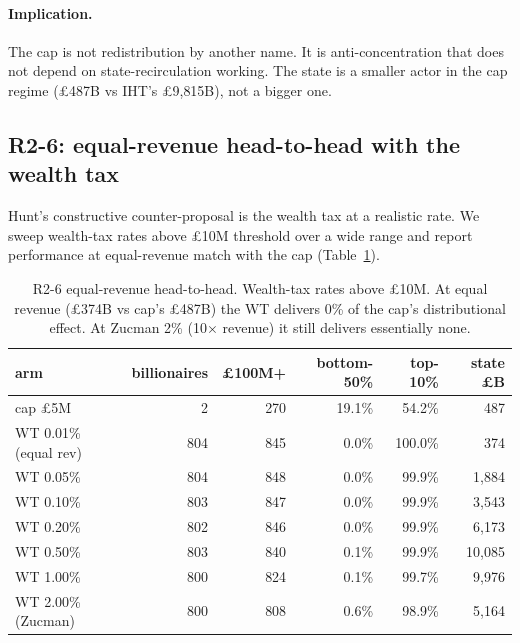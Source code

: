 \documentclass[11pt]{article}
\begin{document}
\paragraph{Implication.}  The cap is not redistribution by another
name.  It is anti-concentration that does not depend on
state-recirculation working.  The state is a smaller actor in the
cap regime (\pounds 487B vs IHT's \pounds 9{,}815B), not a bigger
one.

\subsection{R2-6: equal-revenue head-to-head with the wealth tax}

Hunt's constructive counter-proposal is the wealth tax at a
realistic rate.  We sweep wealth-tax rates above \pounds 10M
threshold over a wide range and report performance at equal-revenue
match with the cap (Table~\ref{tab:r2-equalrev}).

\begin{table}[h]
\centering
\small
\caption{R2-6 equal-revenue head-to-head.  Wealth-tax rates above
\pounds 10M.  At equal revenue (\pounds 374B vs cap's \pounds 487B)
the WT delivers 0\% of the cap's distributional effect.  At Zucman
2\% (10$\times$ revenue) it still delivers essentially none.}
\label{tab:r2-equalrev}
\begin{tabular}{lrrrrr}
\toprule
arm & billionaires & \pounds 100M+ & bottom-50\% & top-10\% & state \pounds B \\
\midrule
cap \pounds 5M           &   2 &  270 & 19.1\% &  54.2\% &    487 \\
WT 0.01\% (equal rev)    & 804 &  845 &  0.0\% & 100.0\% &    374 \\
WT 0.05\%                & 804 &  848 &  0.0\% &  99.9\% & 1{,}884 \\
WT 0.10\%                & 803 &  847 &  0.0\% &  99.9\% & 3{,}543 \\
WT 0.20\%                & 802 &  846 &  0.0\% &  99.9\% & 6{,}173 \\
WT 0.50\%                & 803 &  840 &  0.1\% &  99.9\% & 10{,}085 \\
WT 1.00\%                & 800 &  824 &  0.1\% &  99.7\% & 9{,}976 \\
WT 2.00\% (Zucman)       & 800 &  808 &  0.6\% &  98.9\% & 5{,}164 \\
\bottomrule
\end{tabular}
\end{table}
\end{document}
